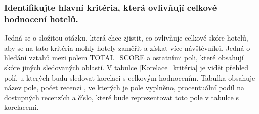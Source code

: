 \documentclass[czech,BP]{thesiskiv}
\begin{document}
\subsubsection{Identifikujte hlavní kritéria, která ovlivňují celkové hodnocení hotelů.}
\label{subsub:kriteria}
Jedná se o složitou otázku, která chce zjistit, co ovlivňuje celkové skóre hotelů, aby se na tato kritéria mohly hotely zaměřit a získat více návštěvníků. Jedná o hledání vztahů mezi polem TOTAL\_SCORE a ostatními poli, které obsahují skóre jiných sledovaných oblastí. V tabulce \ref{Korelace_kritéria} je vidět přehled polí, u kterých budu sledovat korelaci s celkovým hodnocením. Tabulka obsahuje název pole, počet recenzí , ve kterých je pole vyplněno, procentuální podíl na dostupných recenzích a číslo, které bude reprezentovat toto pole v tabulce s korelacemi.
\end{document}
